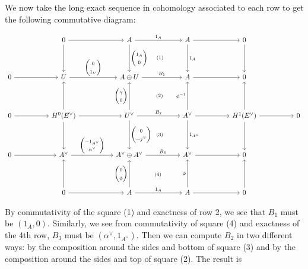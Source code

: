 \documentclass{amsart}
\theoremstyle{definition}
\begin{document}
We now take the long exact sequence in cohomology associated to each
row to get the following commutative diagram:

\begin{equation*}
\begin{tikzcd}[column sep=5em,row sep=4em]
& 0
\arrow[r]
\arrow[d]
& A
\arrow[r,"1_{A}"]
\arrow[d,"\begin{pmatrix}1_{A}\\ 0   \end{pmatrix}"]
& A
\arrow[r]
\arrow[d,"1_{A}"]
& 0
\arrow[d]
& 
\\
0
\arrow[r]
& U
\arrow[r,"\begin{pmatrix}0\\ 1_{U}   \end{pmatrix} "]
& A\oplus U
\arrow[r,"B_{1}"]
\arrow[ur, phantom, "{\scriptstyle(1)}" description]
& A
\arrow[r]
& 0
& 
\\
0\arrow[r]
& H^{0}(E^{\vee})
\arrow[r]
\arrow[u]
\arrow[d]
& U^{\vee }
\arrow[ur, phantom, "{\scriptstyle(2)}" description]
\arrow[r,"B_{2}"]
\arrow[u,"\begin{pmatrix}\gamma \\ 0   \end{pmatrix}"]
\arrow[d,"\begin{pmatrix}0 \\ -j^{\vee }   \end{pmatrix}"]
& A^{\vee}
\arrow[r]
\arrow[u,"\phi^{-1}"]
\arrow[d,"1_{A^{\vee}}"]
& H^{1}(E^{\vee})
\arrow[r]
\arrow[u]
\arrow[d]
& 0
\\
0
\arrow[r]
& A^{\vee }
\arrow[r," \begin{pmatrix} -1_{A^{\vee}}\\ \alpha^{\vee }  \end{pmatrix}"]
& A^{\vee }\oplus A^{\vee }
\arrow[ur, phantom, "{\scriptstyle(3)}" description]
\arrow[r,"B_{3}"]
& A^{\vee }
\arrow[r]
& 0
&
\\
& 0
\arrow[r]
\arrow[u]
& A
\arrow[ur, phantom, "{\scriptstyle(4)}" description]
\arrow[r,"1_{A}"]
\arrow[u," \begin{pmatrix} 0\\ \phi   \end{pmatrix}"]
& A
\arrow[r]
\arrow[u,"\phi "]
& 0
\arrow[u]
&
\end{tikzcd}
\end{equation*}

By commutativity of the square (1) and exactness of row 2, we see that
$B_{1}$ must be $(1_{A},0)$. Similarly, we see from commutativity of
square (4) and exactness of the 4th row, $B_{3}$ must be
$(\alpha^{\vee},1_{A^{\vee}})$. Then we can compute $B_{2}$ in two
different ways: by the composition around the sides and bottom of
square (3) and by the composition around the sides and top of square
(2). The result is
\end{document}
